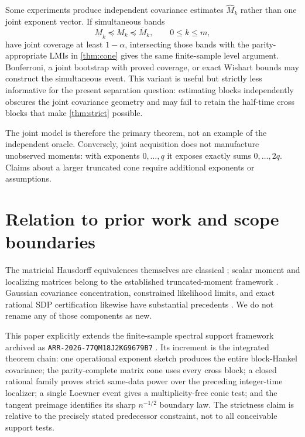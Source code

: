 \documentclass[11pt]{article}
\begin{document}
Some experiments produce independent covariance estimates
$\widehat M_k$ rather than one joint exponent vector.  If simultaneous bands
\[
 \underline M_k\preceq M_k\preceq\overline M_k,\qquad 0\le k\le m, \tag{11.1}
\]
have joint coverage at least $1-\alpha$, intersecting those bands with the
parity-appropriate LMIs in \cref{thm:cone} gives the same finite-sample level
argument.  Bonferroni, a joint bootstrap with proved coverage, or exact
Wishart bounds may construct the simultaneous event.  This variant is useful
but strictly less informative for the present separation question: estimating
blocks independently obscures the joint covariance geometry and may fail to
retain the half-time cross blocks that make \cref{thm:strict} possible.

The joint model is therefore the primary theorem, not an example of the
independent oracle.  Conversely, joint acquisition does not manufacture
unobserved moments: with exponents $0,\ldots,q$ it exposes exactly sums
$0,\ldots,2q$.  Claims about a larger truncated cone require additional
exponents or assumptions.

\section{Relation to prior work and scope boundaries}\label{sec:scope}

The matricial Hausdorff equivalences themselves are classical
\cite{DetteStudden2002,ChoqueRiveroEtAl2006,ChoqueRiveroEtAl2007,
FritzscheKirsteinMaedler2019}; scalar moment and localizing matrices belong to
the established truncated-moment framework
\cite{Lasserre2001,HeltonNie2012}.  Gaussian covariance concentration,
constrained likelihood limits, and exact rational SDP certification likewise
have substantial precedents
\cite{DavidsonSzarek2001,KoltchinskiiLounici2017,Chernoff1954,Shapiro1985,Geyer1994,
PeyrlParrilo2008}.  We do not rename any of those components as new.

This paper explicitly extends the finite-sample spectral support framework
archived as \texttt{ARR-2026-77QM18J2KG9679B7}
\cite{ARRPrior2026}.  Its increment is the integrated theorem chain:
one operational exponent sketch produces the entire block-Hankel covariance;
the parity-complete matrix cone uses every cross block; a closed rational
family proves strict same-data power over the preceding integer-time
localizer; a single Loewner event gives a multiplicity-free conic test; and
the tangent preimage identifies its sharp $n^{-1/2}$ boundary law.  The
strictness claim is relative to the precisely stated predecessor constraint,
not to all conceivable support tests.
\end{document}
